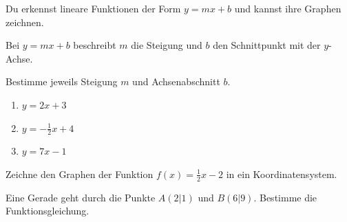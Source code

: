\documentclass[theme=modern,subject=Mathematik,grade=8]{schoolworksheet}
\begin{document}
\begin{infobox}
Du erkennst lineare Funktionen der Form $y=mx+b$ und kannst ihre Graphen zeichnen.
\end{infobox}

\begin{definitionbox}[Merke]
Bei $y=mx+b$ beschreibt $m$ die Steigung und $b$ den Schnittpunkt mit der $y$-Achse.
\end{definitionbox}

\begin{task}[difficulty=1,type=xox,points=4,tag=grundlagen,title=Warm-up]
Bestimme jeweils Steigung $m$ und Achsenabschnitt $b$.
\begin{enumerate}
\item $y=2x+3$
\item $y=-\frac12x+4$
\item $y=7x-1$
\end{enumerate}
\end{task}

\begin{task}[difficulty=2,type=xxo,points=6,tag=graph,title=Graph zeichnen]
Zeichne den Graphen der Funktion $f(x)=\frac12x-2$ in ein Koordinatensystem.
\answerlines[4]
\end{task}

\begin{task}[difficulty=3,type=oox,points=8,tag=modellieren,title=Knobelaufgabe]
Eine Gerade geht durch die Punkte $A(2|1)$ und $B(6|9)$. Bestimme die Funktionsgleichung.
\end{task}
\end{document}
